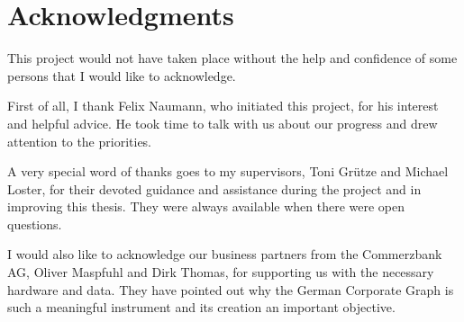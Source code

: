 \section*{Acknowledgments}
This project would not have taken place without the help and confidence of some persons that I would like to acknowledge.

First of all, I thank Felix Naumann, who initiated this project, for his interest and helpful advice. He took time to talk with us about our progress and drew attention to the priorities.

A very special word of thanks goes to my supervisors, Toni Grütze and Michael Loster, for their devoted guidance and assistance during the project and in improving this thesis. They were always available when there were open questions.

I would also like to acknowledge our business partners from the Commerzbank AG, Oliver Maspfuhl and Dirk Thomas, for supporting us with the necessary hardware and data. They have pointed out why the German Corporate Graph is such a meaningful instrument and its creation an important objective.